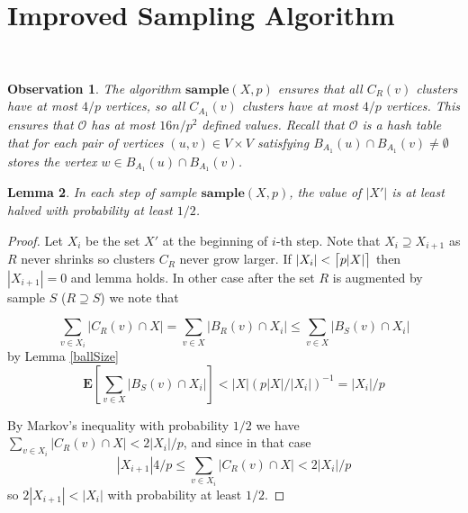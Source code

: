 \documentclass[shortabstract, lic, english]{iithesis}
\theoremstyle{definition} \newtheorem{definition}{Definition}[chapter]
\theoremstyle{plain} \newtheorem{remark}[definition]{Observation}
\theoremstyle{plain} \newtheorem{theorem}[definition]{Theorem}
\theoremstyle{plain} \newtheorem{lemma}[definition]{Lemma}
\theoremstyle{plain} \newtheorem{conjecture}[definition]{Conjecture}
\DeclarePairedDelimiter{\ceil}{\lceil}{\rceil}
\begin{document}
\section{Improved Sampling Algorithm}

\noindent{}

~

\begin{remark} \label{clusterSize}
The algorithm $\mathbf{sample}(X, p)$ ensures that all $C_R(v)$ clusters have at most $4/p$ vertices, so all $C_{A_1}(v)$ clusters have at most $4/p$ vertices.
This ensures that $\mathcal{O}$ has at most $16n/p^2$ defined values.
Recall that $\mathcal{O}$ is a hash table that for each pair of vertices $(u,v) \in V \times V$ satisfying $B_{A_1}(u) \cap B_{A_1}(v) \neq \emptyset$ stores the vertex $w \in B_{A_1}(u) \cap B_{A_1}(v)$.
\end{remark}

\begin{lemma} \label{algSampleLogSteps}
    In each step of sample $\mathbf{sample}(X, p)$, the value of $|X'|$ is at least halved with probability at least $1/2$.
\end{lemma}

\begin{proof}
    Let $X_i$ be the set $X'$ at the beginning of $i$-th step. Note that $X_i \supseteq X_{i+1}$ as $R$ never shrinks so clusters $C_R$ never grow larger.
    If $|X_i| < \ceil[\big]{p  |X|}$ then $|X_{i+1}| = 0$ and lemma holds.
    In other case after the set $R$ is augmented by sample $S$ ($R \supseteq S$) we note that
    

    $$\sum_{v \in X_i} |C_R(v) \cap X| = \sum_{v \in X} |B_R(v) \cap X_i| \leq \sum_{v \in X} |B_S(v) \cap X_i| $$
    by Lemma \ref{ballSize}
    $$\mathbf{E}[\sum_{v \in X} |B_S(v) \cap X_i|] < |X|  (p  |X|/|X_i|)^{-1} = |X_i|/p$$

    By Markov's inequality with probability $1/2$ we have $\sum_{v \in X_i} |C_R(v) \cap X| < 2|X_i|/p$,
    and since in that case 
    $$|X_{i+1}|  4/p \leq \sum_{v \in X_i} |C_R(v) \cap X| < 2|X_i|/p$$
    so $2  |X_{i+1}| < |X_i|$ with probability at least $1/2$.
\end{proof}
\end{document}
